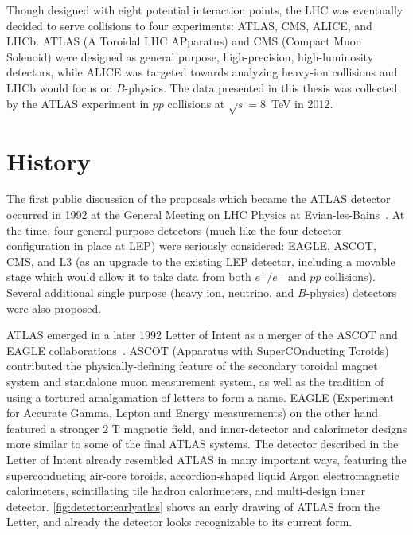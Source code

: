 \label{chapter:detector}

Though designed with eight potential interaction points, the LHC was eventually decided to serve collisions to four experiments: ATLAS, CMS, ALICE, and LHCb. ATLAS (A Toroidal LHC APparatus) and CMS (Compact Muon Solenoid) were designed as general purpose, high-precision, high-luminosity detectors, while ALICE was targeted towards analyzing heavy-ion collisions and LHCb would focus on $B$-physics. The data presented in this thesis was collected by the ATLAS experiment in $pp$ collisions at $\sqrt{s} = 8$~TeV in 2012. 




\section{History}

The first public discussion of the proposals which became the ATLAS detector occurred in 1992 at the General Meeting on LHC Physics at Evian-les-Bains~\cite{Evian,EvianCourier}. At the time, four general purpose detectors (much like the four detector configuration in place at LEP) were seriously considered: EAGLE, ASCOT, CMS, and L3 (as an upgrade to the existing LEP detector, including a movable stage which would allow it to take data from both $e^+/e^-$ and $pp$ collisions). Several additional single purpose (heavy ion, neutrino, and $B$-physics) detectors were also proposed.

ATLAS emerged in a later 1992 Letter of Intent as a merger of the ASCOT and EAGLE collaborations~\cite{ATLAS-LoI}. ASCOT (Apparatus with SuperCOnducting Toroids) contributed the physically-defining feature of the secondary toroidal magnet system and standalone muon measurement system, as well as the tradition of using a tortured amalgamation of letters to form a name. EAGLE (Experiment for Accurate Gamma, Lepton and Energy measurements) on the other hand featured a stronger 2 T magnetic field, and inner-detector and calorimeter designs more similar to some of the final ATLAS systems. The detector described in the Letter of Intent already resembled ATLAS in many important ways, featuring the superconducting air-core toroids, accordion-shaped liquid Argon electromagnetic calorimeters, scintillating tile hadron calorimeters, and multi-design inner detector. \ref{fig:detector:earlyatlas} shows an early drawing of ATLAS from the Letter, and already the detector looks recognizable to its current form.

